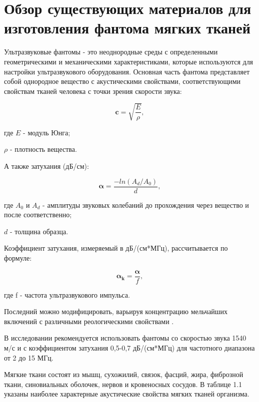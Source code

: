 \section{Обзор существующих материалов для изготовления фантома мягких тканей}

Ультразвуковые фантомы - это неоднородные среды с определенными геометрическими и механическими характеристиками, которые используются для настройки ультразвукового оборудования. Основная часть фантома представляет собой однородное вещество с акустическими свойствами, соответствующими свойствам тканей человека с точки зрения скорости звука:

\begin{equation}
\boldsymbol{c}=\sqrt{\frac{{E}}{{\rho}}},
\end{equation}

где ${E}$ - модуль Юнга;

$\rho$ - плотность вещества.

А также затухания (дБ/см):

\begin{equation}
\boldsymbol{\alpha}=\frac{-ln (A_{d}/A_{0})}{d},
\end{equation}

где $A_{0}$ и $A_{d}$ - амплитуды звуковых колебаний до прохождения через вещество и после соответственно;

$d$ - толщина образца.

Коэффициент затухания, измеряемый в дБ/(см*МГц), рассчитывается по формуле:

\begin{equation}
\boldsymbol{\alpha_{k}}=\frac{\boldsymbol{\alpha}}{f},
\end{equation}

где f - частота ультразвукового импульса.

Последний можно модифицировать, варьируя концентрацию мельчайших включений с различными реологическими свойствами \cite{litlink43}.

В исследовании \cite{litlink44} рекомендуется использовать фантомы со скоростью звука 1540 м/с и с коэффициентом затухания 0,5-0,7 дБ/(см*МГц) для частотного диапазона от 2 до 15 МГц. 

Мягкие ткани состоят из мышц, сухожилий, связок, фасций, жира, фиброзной ткани, синовиальных оболочек, нервов и кровеносных сосудов. В таблице 1.1 указаны наиболее характерные акустические свойства мягких тканей организма.

